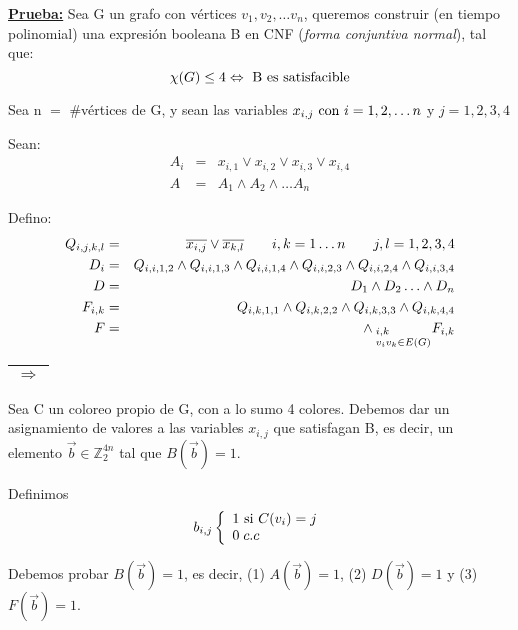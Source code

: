 \documentclass[12pt,a4paper]{report}
\begin{document}
		\textbf{\underline{Prueba:}} Sea G un grafo con vértices $v_{1}, v_{2}, \dotsc v_{n}$, queremos construir (en tiempo polinomial) una expresión booleana B en CNF (\textit{forma conjuntiva normal}), tal que:
			\[ \chi(G) \leq 4 \Leftrightarrow \textup{ B es satisfacible} \]
			\par Sea n $=$ \#vértices de G, y sean las variables $x_{i, j} \textup{ con } i = 1, 2, \dotsc n$ y $j = 1, 2, 3, 4$

			\vspace{3mm}
			\par Sean:
			\begin{eqnarray}
				\nonumber A_{i} &=& x_{i, 1} \vee x_{i, 2} \vee x_{i, 3} \vee x_{i, 4}  \\
				\nonumber A &=& A_{1} \wedge A_{2} \wedge \dotsc A_{n}
			\end{eqnarray}

			\par Defino:
			\begin{eqnarray}
				Q_{i, j, k, l} &=& \overline{x_{i, j}} \vee \overline{x_{k, l}}  \qquad i, k = 1 \dotsc n \qquad j, l = 1, 2, 3, 4 \\
				D_{i} &=& Q_{i, i, 1, 2} \wedge Q_{i, i, 1, 3} \wedge Q_{i, i, 1, 4} \wedge Q_{i, i, 2, 3} \wedge Q_{i, i, 2, 4} \wedge Q_{i, i, 3, 4} \\
				D &=& D_{1} \wedge D_{2} \dotsc \wedge D_{n} \\
				F_{i, k} &=& Q_{i, k, 1, 1} \wedge Q_{i, k, 2, 2} \wedge Q_{i, k, 3, 3} \wedge Q_{i, k, 4, 4} \\
				F &=& \wedge_{\begin{subarray}{l} \; i, k \\ \; v_{i} v_{k} \in E(G) \end{subarray}} F_{i, k}
			\end{eqnarray}

			\begin{tabular}{|c|} \hline $\Rightarrow$ \\ \hline \end{tabular}
				\vspace{3mm}

				\par Sea C un coloreo propio de G, con a lo sumo 4 colores. Debemos dar un asignamiento de valores a las variables $x_{i, j}$ que satisfagan B, es decir, un elemento $\overrightarrow{b} \in \mathbb{Z}^{4n}_{2}$ tal que $B(\overrightarrow{b}) = 1$.

				\vspace{5mm}
				\par Definimos
				\begin{equation*}
					b_{i, j}
		  			\left \lbrace
		  			\begin{array}{l}
		    		 1 \textup{ si } C(v_{i}) = j \\
		     		 0 \; c.c \\
		  			\end{array}
		  			\right.
				\end{equation*}
				\par Debemos probar $B(\overrightarrow{b}) = 1$, es decir, (1) $A(\overrightarrow{b}) = 1$, (2) $D(\overrightarrow{b}) = 1$ y (3) $F(\overrightarrow{b}) = 1$.
\end{document}
